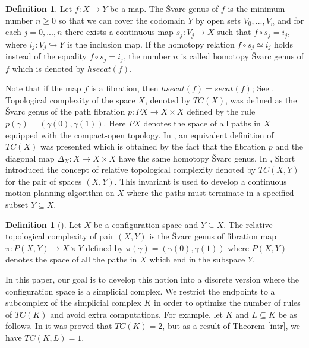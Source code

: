 \documentclass[preprint,11pt %
]{hjm1}
\theoremstyle{definition}
\newtheorem{definition}[theorem]{Definition}
\begin{document}
\begin{definition} 
Let $f:X \to Y$ be a map. The \v{S}varc genus of $f$ is the  minimum number $n\geq 0$ so that we can cover the codomain $Y$ by open sets $V_0,...,V_n$ and for each $j=0,...,n$ there exists a continuous map $s_j:V_j\to X$ such that $f\circ s_j=i_j$, where $i_j:V_j\hookrightarrow Y$ is the inclusion map. 
If the homotopy relation $f\circ s_j\simeq i_j$ holds instead of the equality $f\circ s_j=i_j$, the number $n$ is called homotopy  \v{S}varc genus of $f$ which is denoted by $hsecat(f)$. 
\end{definition}

Note that if the map $f$ is a fibration, then $hsecat(f)=secat(f)$; See \cite{Sch}. 
Topological complexity of the space $X$, denoted by $TC(X)$, was defined as the \v{S}varc genus of the path fibration $p:PX\to X\times X$ defined  by the rule  $p(\gamma )=(\gamma (0),\gamma (1))$. Here $PX$ denotes the space of all paths in $X$ equipped with the compact-open topology. In \cite{dis}, an equivalent definition of $TC(X)$ was presented which is obtained by the fact that the fibration $p$ and the diagonal map $\Delta _X:X\to X\times X$ have the same homotopy \v{S}varc genus.  
In \cite{rel}, Short introduced the concept of relative topological complexity denoted by $TC(X,Y)$ for the pair of spaces $(X,Y)$. This invariant is used to develop a continuous motion planning algorithm on $X$ where the paths must terminate in a specified subset $Y\subseteq X$.

\begin{definition}[\cite{rel}]\label{de2.2n}
Let $X$ be a configuration space and $Y \subseteq X$. The relative topological complexity of pair $(X, Y)$ is the \v{S}varc genus of fibration map $\pi:P(X,Y)\to X\times Y$ defined by $\pi (\gamma )=(\gamma (0),\gamma (1))$ where $P(X,Y)$ denotes the space of all the paths in $X$ which end in the subspace $Y$.
\end{definition}

In this paper, our goal is to develop this notion into a discrete version where the configuration space is a simplicial complex. We restrict the endpoints to a subcomplex of the simplicial complex $K$ in order to optimize the number of rules of $TC(K)$ and avoid extra computations. 
For example, let $K$ and $L\subseteq K$ be as follows. In \cite{dis} it was proved that $TC(K)=2$, but as a result of Theorem \ref{intr}, we have $TC(K,L)=1$.
\end{document}
